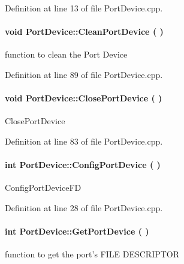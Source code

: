 \begin{appendices}
\-Definition at line 13 of file \-Port\-Device.\-cpp.

\paragraph[{\-Clean\-Port\-Device}]{\setlength{\rightskip}{0pt plus 5cm}void {\bf \-Port\-Device\-::\-Clean\-Port\-Device} (
)}\label{class_port_device_ab961a8d36a509d74ec73560ecf8e08c3}
function to clean the \-Port \-Device 

\-Definition at line 89 of file \-Port\-Device.\-cpp.

\paragraph[{\-Close\-Port\-Device}]{\setlength{\rightskip}{0pt plus 5cm}void {\bf \-Port\-Device\-::\-Close\-Port\-Device} (
)}\label{class_port_device_a46070f7913dc823c394a5420efbe1e20}
\-Close\-Port\-Device 

\-Definition at line 83 of file \-Port\-Device.\-cpp.

\paragraph[{\-Config\-Port\-Device}]{\setlength{\rightskip}{0pt plus 5cm}int {\bf \-Port\-Device\-::\-Config\-Port\-Device} (
)}\label{class_port_device_a40bbaa8614cadd8420fa32a72024aa0a}
\-Config\-Port\-Device\-F\-D 

\-Definition at line 28 of file \-Port\-Device.\-cpp.

\paragraph[{\-Get\-Port\-Device}]{\setlength{\rightskip}{0pt plus 5cm}int {\bf \-Port\-Device\-::\-Get\-Port\-Device} (
)}\label{class_port_device_a385e13c178d6d8b61688e7df29e43f71}
function to get the port's \-F\-I\-L\-E \-D\-E\-S\-C\-R\-I\-P\-T\-O\-R 


\end{appendices}

